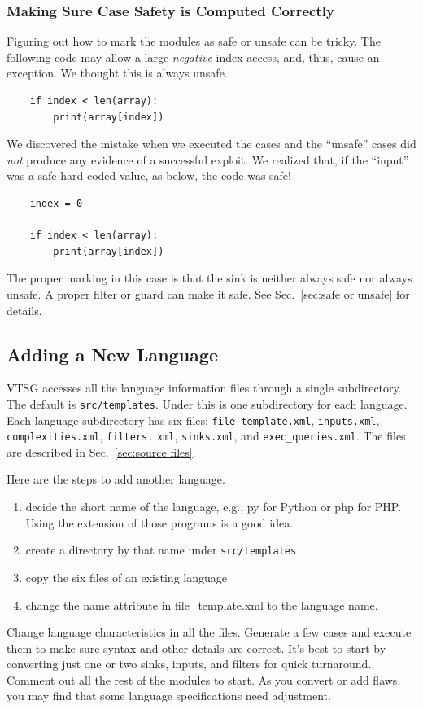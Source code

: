 \subsubsection{Making Sure Case Safety is Computed Correctly}

Figuring out how to mark the modules as safe or unsafe can be tricky.
The following code may allow a large \emph{negative} index access, and, thus, cause an
exception.  We thought this is always unsafe.
\begin{verbatim}
    if index < len(array):
        print(array[index])
\end{verbatim}
We discovered the mistake when we executed the cases and the ``unsafe'' cases did
\emph{not} produce any evidence of a successful exploit.  We realized that, if the
``input'' was a safe hard coded
value, as below, the code was safe!
\begin{verbatim}
    index = 0

    if index < len(array):
        print(array[index])
\end{verbatim}
The proper marking in this case is that the sink is neither always safe nor always unsafe.
A proper filter or guard can make it safe.
See Sec.~\ref{sec:safe or unsafe} for details.

\subsection{Adding a New Language}
\label{sec:add a language}

\label{sec: language directory structure}
VTSG accesses all the language information files through a
single subdirectory.  The default is \verb|src/templates|.  Under this is one
subdirectory for each language.  Each language subdirectory has six files:
\verb|file_template.xml|, \verb|inputs.xml|, \verb|complexities.xml|,
\verb|filters.| \verb|xml|, \verb|sinks.xml|, and \verb|exec_queries.xml|.  The files
are described in Sec.~\ref{sec:source files}.

Here are the steps to add another language.
\begin{enumerate}[nosep]
\item decide the short name of the language, e.g., py for Python or php for
  PHP.  Using the extension of those programs is a good idea.
\item create a directory by that name under \verb|src/templates|
\item copy the six files of an existing language
\item change the name attribute in file\_template.xml to the language name.
\end{enumerate}
Change language characteristics in all the files.  Generate a few cases and
execute them to make sure syntax and other details are correct.  It's best to
start by converting just one or two sinks, inputs, and filters for quick turnaround.
Comment out all the rest of the modules to start.
As you convert or add flaws, you may find that some language specifications need
adjustment.

